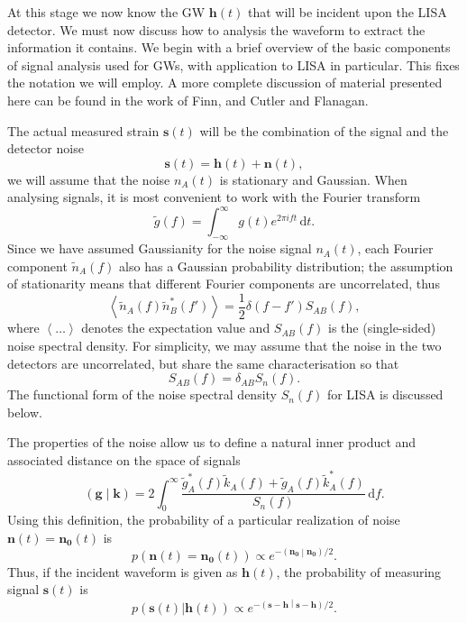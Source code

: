 \documentclass[a4paper, 11pt, titlepage, twoside]{report}
\newcommand{\recip}[1]{\ensuremath{\frac{1}{#1}}}
\newcommand{\innerprod}[2]{\ensuremath{\left({#1}\middle|{#2}\right)}}
\newcommand{\dd}{\ensuremath{\mathrm{d}}}
\newcommand{\intd}[4]{\ensuremath{\int_{#1}^{#2}{#3}\,\dd{#4}}}
\begin{document}
{At this stage we now know the GW $\boldsymbol{h}(t)$ that will be incident upon the LISA detector. We must now discuss how to analysis the waveform to extract the information it contains. We begin with a brief overview of the basic components of signal analysis used for GWs, with application to LISA in particular. This fixes the notation we will employ. A more complete discussion of material presented here can be found in the work of Finn\cite{Finn1992}, and Cutler and Flanagan\cite{Cutler1994}.

The actual measured strain $\boldsymbol{s}(t)$ will be the combination of the signal and the detector noise
\begin{equation}
\boldsymbol{s}(t) = \boldsymbol{h}(t) + \boldsymbol{n}(t),
\end{equation}
we will assume that the noise $n_A(t)$ is stationary and Gaussian. When analysing signals, it is most convenient to work with the Fourier transform
\begin{equation}
\tilde{g}(f) = \intd{-\infty}{\infty}{g(t)e^{2\pi i ft}}{t}.
\end{equation}
Since we have assumed Gaussianity for the noise signal $n_A(t)$, each Fourier component $\tilde{n}_A(f)$ also has a Gaussian probability distribution; the assumption of stationarity means that different Fourier components are uncorrelated, thus\cite{Cutler1994}
\begin{equation}
\left\langle\tilde{n}_A(f)\tilde{n}_B^*(f')\right\rangle = \recip{2}\delta(f - f')S_{AB}(f),
\end{equation}
where $\left\langle\ldots\right\rangle$ denotes the expectation value and $S_{AB}(f)$ is the (single-sided) noise spectral density. For simplicity, we may assume that the noise in the two detectors are uncorrelated, but share the same characterisation so that\cite{Cutler1998}
\begin{equation}
S_{AB}(f) = \delta_{AB}S_n(f).
\end{equation}
The functional form of the noise spectral density $S_n(f)$ for LISA is discussed below.

The properties of the noise allow us to define a natural inner product and associated distance on the space of signals\cite{Cutler1994}
\begin{equation}
\innerprod{\boldsymbol{g}}{\boldsymbol{k}} = 2\intd{0}{\infty}{\frac{\tilde{g}_A^*(f)\tilde{k}_A(f) + \tilde{g}_A(f)\tilde{k}_A^*(f)}{S_n(f)}}{f}.
\end{equation}
Using this definition, the probability of a particular realization of noise $\boldsymbol{n}(t) = \boldsymbol{n_0}(t)$ is
\begin{equation}
p(\boldsymbol{n}(t) = \boldsymbol{n_0}(t)) \propto e^{-\innerprod{\boldsymbol{n_0}}{\boldsymbol{n_0}}/2}.
\end{equation}
Thus, if the incident waveform is given as $\boldsymbol{h}(t)$, the probability of measuring signal $\boldsymbol{s}(t)$ is
\begin{equation}
p(\boldsymbol{s}(t)|\boldsymbol{h}(t)) \propto e^{-\innerprod{\boldsymbol{s}-\boldsymbol{h}}{\boldsymbol{s}-\boldsymbol{h}}/2}.
\label{eq:sig_prob}
\end{equation}

}
\end{document}
